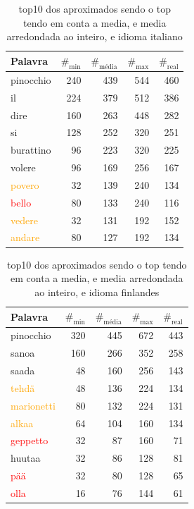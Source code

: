 \documentclass[mirror, portugues]{revdetua}
\begin{document}
\begin{table}[H]
\centering
\caption{top10 dos aproximados sendo o top tendo em conta a media, e media arredondada ao inteiro, e idioma italiano}
\label{table:top10_aprox_italiano}
\begin{tabular}{lrrr|r}
\toprule
Palavra & $\text{\#}_{\text{min}}$ & $\text{\#}_{\text{média}}$ & $\text{\#}_{\text{max}}$ & $\text{\#}_{\text{real}}$ \\
\midrule
pinocchio & 240 & 439 & 544 & 460 \\
il & 224 & 379 & 512 & 386 \\
dire & 160 & 263 & 448 & 282 \\
si & 128 & 252 & 320 & 251 \\
burattino & 96 & 223 & 320 & 225 \\
volere & 96 & 169 & 256 & 167 \\
\textcolor{orange}{povero} & 32 & 139 & 240 & 134 \\
\textcolor{red}{bello} & 80 & 133 & 240 & 116 \\
\textcolor{orange}{vedere} & 32 & 131 & 192 & 152 \\
\textcolor{orange}{andare} & 80 & 127 & 192 & 134 \\
\bottomrule
\end{tabular}
\end{table}

\begin{table}[H]
\centering
\caption{top10 dos aproximados sendo o top tendo em conta a media, e media arredondada ao inteiro, e idioma finlandes}
\label{table:top10_aprox_finlandes}
\begin{tabular}{lrrr|r}
\toprule
Palavra & $\text{\#}_{\text{min}}$ & $\text{\#}_{\text{média}}$ & $\text{\#}_{\text{max}}$ & $\text{\#}_{\text{real}}$ \\
\midrule
pinocchio & 320 & 445 & 672 & 443 \\
sanoa & 160 & 266 & 352 & 258 \\
saada & 48 & 160 & 256 & 143 \\
\textcolor{orange}{tehdä} & 48 & 136 & 224 & 134 \\
\textcolor{orange}{marionetti} & 80 & 132 & 224 & 131 \\
\textcolor{orange}{alkaa} & 64 & 104 & 160 & 134 \\
\textcolor{red}{geppetto} & 32 & 87 & 160 & 71 \\
huutaa & 32 & 86 & 128 & 81 \\
\textcolor{red}{pää} & 32 & 80 & 128 & 65 \\
\textcolor{red}{olla} & 16 & 76 & 144 & 61 \\
\bottomrule
\end{tabular}
\end{table}
\end{document}
